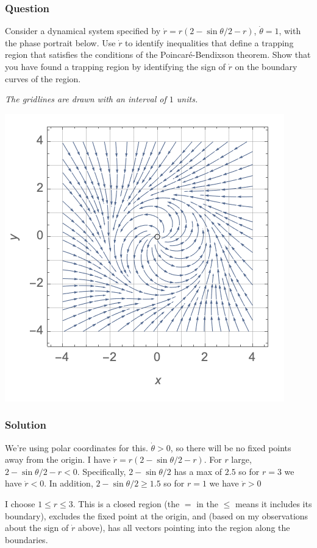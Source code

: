 \documentclass[12pt,letterpaper,noanswers]{exam}
\begin{document}
\subsubsection{Question}
Consider a dynamical system specified by $\dot r = r(2-\sin\theta/2 -r)$, $\dot\theta = 1$, with the phase portrait below.  Use $\dot r$ to identify inequalities that define a trapping region that satisfies the conditions of the Poincar\'e-Bendixson theorem.  Show that you have found a trapping region by identifying the sign of $\dot r$ on the boundary curves of the region.


\emph{The gridlines are drawn with an interval of $1$ units.}


\includegraphics[]{img/C14-C15trapping.png}

\subsubsection{Solution}

We're using polar coordinates for this. $\dot\theta >0$, so there will be no fixed points away from the origin.  I have $\dot r = r(2-\sin\theta/2-r)$.  For $r$ large, $2-\sin\theta/2 -r < 0$.  Specifically, $2-\sin\theta/2$ has a max of $2.5$ so for $r = 3$ we have $\dot r < 0$.  In addition, $2-\sin\theta/2\geq 1.5$ so for $r = 1$ we have $\dot r > 0$

I choose $1 \leq r \leq 3$.  This is a closed region (the $=$ in the $\leq$ means it includes its boundary), excludes the fixed point at the origin, and (based on my observations about the sign of $\dot r$ above), has all vectors pointing into the region along the boundaries.
\end{document}
